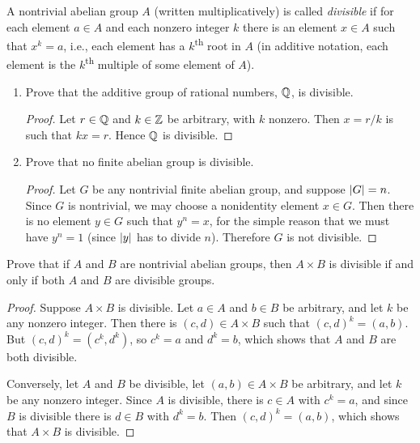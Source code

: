 \label{exercise:generated-subgroups:divisible-group}
A nontrivial abelian group $A$ (written multiplicatively) is called
{\em divisible} if for each element $a\in A$ and each nonzero integer
$k$ there is an element $x\in A$ such that $x^k = a$, i.e., each
element has a $k$\textsuperscript{th} root in $A$ (in additive
notation, each element is the $k$\textsuperscript{th} multiple of some
element of $A$).
\begin{enumerate}
\item Prove that the additive group of rational numbers, $\mathbb{Q}$, is
  divisible.
  \begin{proof}
    Let $r\in\mathbb{Q}$ and $k\in\mathbb{Z}$ be arbitrary, with $k$ nonzero. Then
    $x = r/k$ is such that $kx = r$. Hence $\mathbb{Q}$ is divisible.
  \end{proof}
\item Prove that no finite abelian group is divisible.
  \begin{proof}
    Let $G$ be any nontrivial finite abelian group, and suppose
    $\lvert{G}\rvert = n$. Since $G$ is nontrivial, we may choose a
    nonidentity element $x\in G$. Then there is no element $y\in G$
    such that $y^n = x$, for the simple reason that we must have
    $y^n = 1$ (since $\lvert{y}\rvert$ has to divide $n$). Therefore $G$ is
    not divisible.
  \end{proof}
\end{enumerate}

 Prove that if $A$ and $B$ are nontrivial abelian groups,
then $A\times B$ is divisible if and only if both $A$ and $B$ are
divisible groups.
\begin{proof}
  Suppose $A\times B$ is divisible. Let $a\in A$ and $b\in B$ be
  arbitrary, and let $k$ be any nonzero integer. Then there is
  $(c,d)\in A\times B$ such that $(c,d)^k = (a,b)$. But
  $(c,d)^k = (c^k,d^k)$, so $c^k = a$ and $d^k = b$, which shows that
  $A$ and $B$ are both divisible.

  Conversely, let $A$ and $B$ be divisible, let $(a,b)\in A\times B$
  be arbitrary, and let $k$ be any nonzero integer. Since $A$ is
  divisible, there is $c\in A$ with $c^k = a$, and since $B$ is
  divisible there is $d\in B$ with $d^k = b$. Then $(c,d)^k = (a,b)$,
  which shows that $A\times B$ is divisible.
\end{proof}
